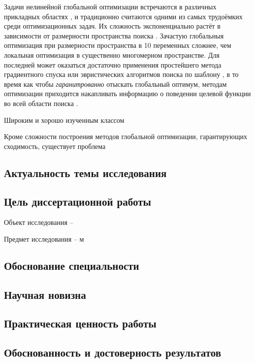 
Задачи нелинейной глобальной оптимизации встречаются в различных прикладных областях \cite{Kvasov2013, Barkalov2013},
и традиционно считаются одними из самых трудоёмких среди оптимизационных задач.
Их сложность экспоненциально растёт в зависимости от размерности пространства поиска \cite{Vavasis1995}.
Зачастую глобальныя оптимизация при размерности пространства в 10 переменных сложнее,
чем локальная оптимизация в существенно многомерном пространстве.
Для последней может оказаться достаточно применения простейшего метода градиентного спуска
или эвристических алгоритмов поиска по шаблону \cite{torczon1997},
в то время как чтобы \textit{гаранитрованно} отыскать глобальный оптимум, методам
оптимизации приходится накапливать информацию о поведении целевой функции во всей области поиска
\cite{Jones2009,Paulavicius2011,Evtushenko2013,Strongin2000}.

Широким и хорошо изученным классом 

Кроме сложности построения методов глобальной оптимизации, гарантирующих сходимость, существует
проблема 



\subsection*{Актуальность темы исследования}

\subsection*{Цель диссертационной работы}


Объект исследования –

Предмет исследования – м

\subsection*{Обоснование специальности}

\subsection*{Научная новизна}

\subsection*{Практическая ценность работы}

\subsection*{Обоснованность и достоверность результатов}

